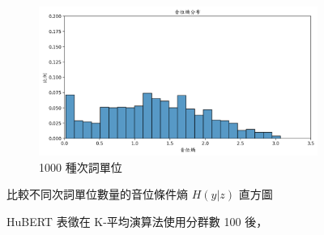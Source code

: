 {{\begin{figure}
\begin{subfigure}{\textwidth}
                 \label{fig:hub-u100-ap0500-phnent-hist}
             \end{subfigure}
             \vfill
             \begin{subfigure}{\textwidth}
                 \centering
                 \includegraphics[width=\tempwidth]{figures/ch4figs/hub-u100-ap1000-phnent-hist.png}
                 \caption{1000 種次詞單位}
                 \label{fig:hub-u100-ap1000-phnent-hist}
             \end{subfigure}

             \caption{HuBERT 表徵在 K-平均演算法使用分群數 100 後，}
             比較不同次詞單位數量的音位條件熵 $H(y|z)$ 直方圖
             \label{fig:hub-u100-hist-comparisons}
        \end{figure}
    }
}
